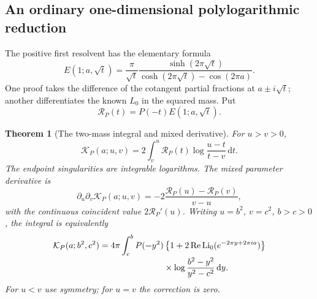 \documentclass[11pt,letterpaper]{article}
\numberwithin{equation}{section}
\newtheorem{theorem}{Theorem}[section]
\theoremstyle{definition}
\newcommand{\Li}{\operatorname{Li}}
\newcommand{\Rea}{\operatorname{Re}}
\newcommand{\dd}{\,\mathrm{d}}
\begin{document}
\subsection{An ordinary one-dimensional polylogarithmic reduction}
The positive first resolvent has the elementary formula
\begin{equation}\label{hqj:eq:E1}
E(1;a,\sqrt t)
=\frac\pi{\sqrt t}
\frac{\sinh(2\pi\sqrt t)}{\cosh(2\pi\sqrt t)-\cos(2\pi a)}.
\end{equation}
One proof takes the difference of the cotangent partial fractions at
$a\pm i\sqrt t$; another differentiates the known $L_0$ in the squared
mass. Put
\begin{equation}\label{hqj:eq:RP}
\mathcal R_P(t)=P(-t)E(1;a,\sqrt t).
\end{equation}

\begin{theorem}[The two-mass integral and mixed derivative]
\label{hqj:thm:Kintegral}
For $u>v>0$,
\begin{equation}\label{hqj:eq:Kintegral}
\boxed{\mathcal K_P(a;u,v)=2\int_v^u
\mathcal R_P(t)\log\frac{u-t}{t-v}\dd t.}
\end{equation}
The endpoint singularities are integrable logarithms. The mixed
parameter derivative is
\begin{equation}\label{hqj:eq:Kmixed}
\partial_u\partial_v\mathcal K_P(a;u,v)
=-2\frac{\mathcal R_P(u)-\mathcal R_P(v)}{v-u},
\end{equation}
with the continuous coincident value $2\mathcal R_P'(u)$.
Writing $u=b^2$, $v=c^2$, $b>c>0$, the integral is equivalently
\begin{align}
\mathcal K_P(a;b^2,c^2)=4\pi\int_c^b P(-y^2)
&\left\{1+2\Rea\Li_0(e^{-2\pi y+2\pi ia})\right\}
\notag\\[-2pt]
&\times\log\frac{b^2-y^2}{y^2-c^2}\dd y.
\label{hqj:eq:Kpolylog}
\end{align}
For $u<v$ use symmetry; for $u=v$ the correction is zero.
\end{theorem}
\end{document}
